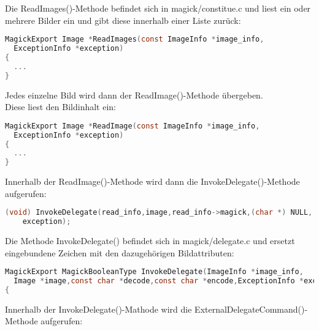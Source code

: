 Die ReadImages()-Methode befindet sich in magick/constitue.c und liest ein oder mehrere Bilder ein und gibt diese innerhalb einer Liste zurück:\\

\begin{lstlisting}[firstnumber=790, language=C, caption=magick/constitute.c ReadImages(),label={lst:lstlisting}]
MagickExport Image *ReadImages(const ImageInfo *image_info,
  ExceptionInfo *exception)
{
  ...
}
\end{lstlisting}
\vspace{5mm}

Jedes einzelne Bild wird dann der ReadImage()-Methode übergeben.\\
Diese liest den Bildinhalt ein:\\

\begin{lstlisting}[firstnumber=352, language=C, caption=magick/constitute.c ReadImage(),label={lst:lstlisting}]
MagickExport Image *ReadImage(const ImageInfo *image_info,
  ExceptionInfo *exception)
{
  ...
}
\end{lstlisting}
\vspace{5mm}

Innerhalb der ReadImage()-Methode wird dann die InvokeDelegate()-Methode aufgerufen:\\

\begin{lstlisting}[firstnumber=523, language=C, caption=magick/constitue.c Aufruf InvokeDelegate(),label={lst:lstlisting}]
  (void) InvokeDelegate(read_info,image,read_info->magick,(char *) NULL,
    exception);
\end{lstlisting}
\vspace{5mm}

Die Methode InvokeDelegate() befindet sich in magick/delegate.c und ersetzt eingebundene Zeichen mit den dazugehörigen Bildattributen:\\

\begin{lstlisting}[firstnumber=1097, language=C, caption=magick/delegate.c InvokeDelegate(),label={lst:lstlisting}]
MagickExport MagickBooleanType InvokeDelegate(ImageInfo *image_info,
  Image *image,const char *decode,const char *encode,ExceptionInfo *exception)
{
\end{lstlisting}
\vspace{5mm}

Innerhalb der InvokeDelegate()-Mathode wird die ExternalDelegateCommand()-Methode aufgerufen:\\

